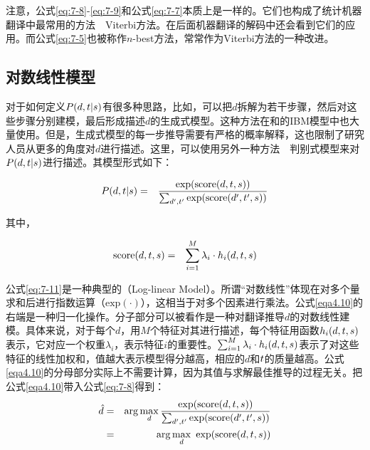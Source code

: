 \parinterval 注意，公式\eqref{eq:7-8}-\eqref{eq:7-9}和公式\eqref{eq:7-7}本质上是一样的。它们也构成了统计机器翻译中最常用的方法\ \dash \ Viterbi方法。在后面机器翻译的解码中还会看到它们的应用。而公式\eqref{eq:7-5}也被称作$n$-best方法，常常作为Viterbi方法的一种改进。


\subsection{对数线性模型}

\parinterval 对于如何定义${P}(d,{t}|{s})$有很多种思路，比如，可以把$d$拆解为若干步骤，然后对这些步骤分别建模，最后形成描述$d$的生成式模型。这种方法在{\chapterfive}和{\chaptersix}的IBM模型中也大量使用。但是，生成式模型的每一步推导需要有严格的概率解释，这也限制了研究人员从更多的角度对$d$进行描述。这里，可以使用另外一种方法\ \dash \ 判别式模型来对${P}(d,{t}|{s})$进行描述。其模型形式如下：

\begin{eqnarray}
{P}(d,{t}|{s}) &=& \frac{\textrm{exp}(\textrm{score}(d,{t},{s}))}{\sum_{d',{t}'} \textrm{exp}(\textrm{score}(d',{t}',{s}))} \label{eqa4.10}
\end{eqnarray}

\noindent 其中，

\begin{eqnarray}
\textrm{score}(d,{t},{s}) &=& \sum_{i=1}^{M} \lambda_i \cdot h_i (d,{t},{s})
\label{eq:7-11}
\end{eqnarray}

\parinterval 公式\eqref{eq:7-11}是一种典型的{\small{}}（Log-linear Model）。所谓“对数线性”体现在对多个量求和后进行指数运算（$\textrm{exp}(\cdot)$），这相当于对多个因素进行乘法。公式\eqref{eqa4.10}的右端是一种归一化操作。分子部分可以被看作是一种对翻译推导$d$的对数线性建模。具体来说，对于每个$d$，用$M$个特征对其进行描述，每个特征用函数$h_i (d,{t},{s})$表示，它对应一个权重$\lambda_i$，表示特征$i$的重要性。$\sum_{i=1}^{M} \lambda_i \cdot h_i (d,{t},{s})$表示了对这些特征的线性加权和，值越大表示模型得分越高，相应的$d$和${t}$的质量越高。公式\eqref{eqa4.10}的分母部分实际上不需要计算，因为其值与求解最佳推导的过程无关。把公式\eqref{eqa4.10}带入公式\eqref{eq:7-8}得到：
\begin{eqnarray}
\hat{d} &=& \arg\max_{d} \frac{\textrm{exp}(\textrm{score}(d,\seq{t},\seq{s}))}{\sum_{d',\seq{t}'} \textrm{exp}(\textrm{score}(d',\seq{t}',\seq{s}))} \nonumber \\
&=& \arg\max_{d}\ \textrm{exp}(\textrm{score}(d,\seq{t},\seq{s}))
\label{eq:7-12}
\end{eqnarray}

